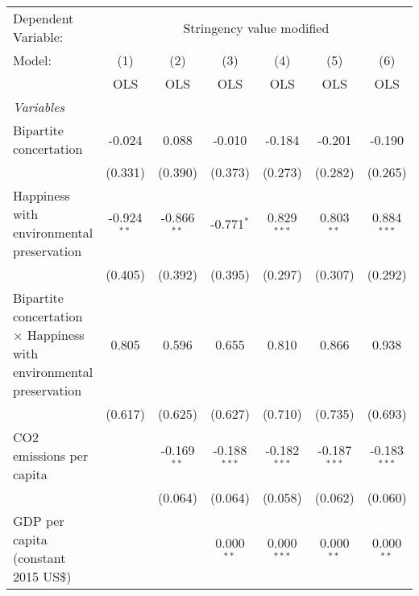 
\begingroup
\centering
\begin{tabular}{lcccccc}
   \toprule
   Dependent Variable: & \multicolumn{6}{c}{Stringency value modified}\\
   Model:                                                                     & (1)           & (2)           & (3)            & (4)            & (5)            & (6)\\  
                                                                              &  OLS          & OLS           & OLS            & OLS            & OLS            & OLS\\  
   \midrule
   \emph{Variables}\\
   Bipartite concertation                                                     & -0.024        & 0.088         & -0.010         & -0.184         & -0.201         & -0.190\\   
                                                                              & (0.331)       & (0.390)       & (0.373)        & (0.273)        & (0.282)        & (0.265)\\   
   Happiness with environmental preservation                                  & -0.924$^{**}$ & -0.866$^{**}$ & -0.771$^{*}$   & 0.829$^{***}$  & 0.803$^{**}$   & 0.884$^{***}$\\   
                                                                              & (0.405)       & (0.392)       & (0.395)        & (0.297)        & (0.307)        & (0.292)\\   
   Bipartite concertation $\times$ Happiness with environmental preservation  & 0.805         & 0.596         & 0.655          & 0.810          & 0.866          & 0.938\\   
                                                                              & (0.617)       & (0.625)       & (0.627)        & (0.710)        & (0.735)        & (0.693)\\   
   CO2 emissions per capita                                                   &               & -0.169$^{**}$ & -0.188$^{***}$ & -0.182$^{***}$ & -0.187$^{***}$ & -0.183$^{***}$\\   
                                                                              &               & (0.064)       & (0.064)        & (0.058)        & (0.062)        & (0.060)\\   
   GDP per capita (constant 2015 US\$)                                        &               &               & 0.000$^{**}$   & 0.000$^{***}$  & 0.000$^{**}$   & 0.000$^{**}$\\   

\end{tabular}
